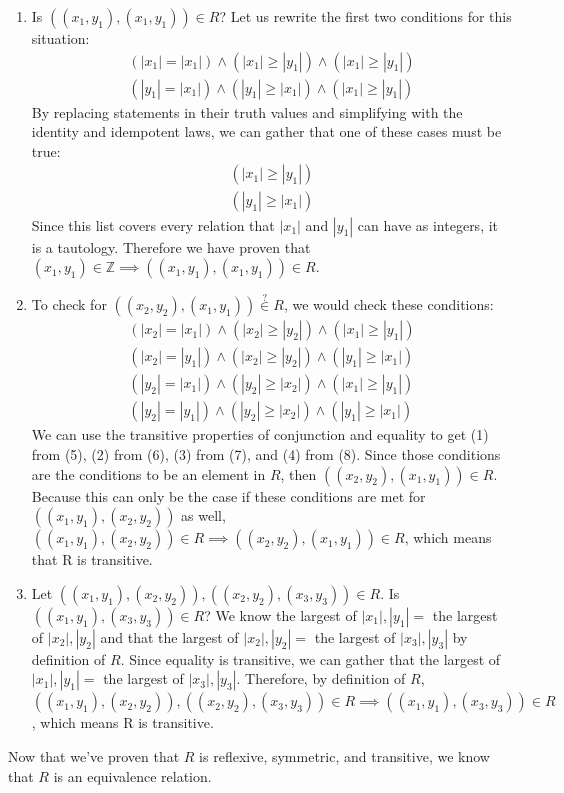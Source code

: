 \documentclass{article}
\begin{document}
\begin{enumerate}
    \item Is $((x_1,y_1),(x_1,y_1)) \in R$? Let us rewrite the first two conditions for this situation:
    \begin{gather*}
        (|x_1| = |x_1|) \land (|x_1| \geq |y_1|) \land (|x_1| \geq |y_1|) \\
        (|y_1| = |x_1|) \land (|y_1| \geq |x_1|) \land (|x_1| \geq |y_1|)
    \end{gather*}
    By replacing statements in their truth values and simplifying with the identity and idempotent laws, we can gather that one of these cases must be true:
    \begin{gather*}
        (|x_1| \geq |y_1|) \\
        (|y_1| \geq |x_1|)
    \end{gather*}
    Since this list covers every relation that $|x_1|$ and $|y_1|$ can have as integers, it is a tautology. Therefore we have proven that $(x_1,y_1) \in \mathbb{Z} \implies ((x_1,y_1),(x_1,y_1)) \in R$.


    \item To check for $((x_2,y_2),(x_1,y_1)) \stackrel{?}{\in} R$, we would check these conditions:
    \begin{gather}
        (|x_2| = |x_1|) \land (|x_2| \geq |y_2|) \land (|x_1| \geq |y_1|) \\
        (|x_2| = |y_1|) \land (|x_2| \geq |y_2|) \land (|y_1| \geq |x_1|) \\
        (|y_2| = |x_1|) \land (|y_2| \geq |x_2|) \land (|x_1| \geq |y_1|) \\
        (|y_2| = |y_1|) \land (|y_2| \geq |x_2|) \land (|y_1| \geq |x_1|)
    \end{gather}
    We can use the transitive properties of conjunction and equality to get (1) from (5), (2) from (6), (3) from (7), and (4) from (8). Since those conditions are the conditions to be an element in $R$, then $((x_2,y_2),(x_1,y_1)) \in R$. Because this can only be the case if these conditions are met for $((x_1,y_1), (x_2,y_2))$ as well, $((x_1,y_1), (x_2,y_2)) \in R \implies ((x_2,y_2),(x_1,y_1)) \in R$, which means that R is transitive.


    \item Let $((x_1,y_1), (x_2,y_2)), ((x_2,y_2),(x_3,y_3)) \in R$. Is $((x_1,y_1), (x_3,y_3)) \in R$? 
    We know the largest of $|x_1|,|y_1| =$ the largest of $|x_2|,|y_2|$ and that the largest of $|x_2|,|y_2| =$ the largest of $|x_3|,|y_3|$ by definition of $R$.
    Since equality is transitive, we can gather that the largest of $|x_1|,|y_1| =$ the largest of $|x_3|,|y_3|$. 
    Therefore, by definition of $R$, $((x_1,y_1), (x_2,y_2)), ((x_2,y_2),(x_3,y_3)) \in R \implies \allowbreak ((x_1,y_1), (x_3,y_3)) \in R$, which means R is transitive.
\end{enumerate}
Now that we've proven that $R$ is reflexive, symmetric, and transitive, we know that $R$ is an equivalence relation.
\end{document}
